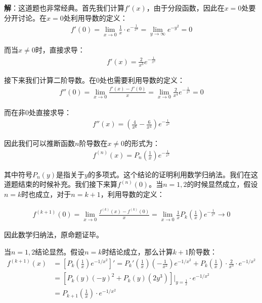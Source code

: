 \documentclass{ctexart}
\let\oldtextbf\textbf %
\renewcommand{\textbf}[1]{\textcolor{btex}{\oldtextbf{#1}}} %
\begin{document}
\textbf{解}：这道题也非常经典。首先我们计算$f'(x)$，由于分段函数，因此在$x=0$处要分开讨论。在$x=0$处利用导数的定义：
\begin{align*}
f'(0)=\lim_{x\to 0}\frac{1}{x}\cdot e^{-\frac{1}{x^2}}=\lim_{y\to \infty}e^{-y^2}=0  
\end{align*}

而当$x\neq 0$时，直接求导：
\begin{align*}
    f'(x)=\frac{2}{x^3}e^{-\frac{1}{x^2}}
\end{align*}

接下来我们计算二阶导数。在0处也需要利用导数的定义：
\begin{align*}
    f''(0)=\lim_{x\to 0}\frac{f'(x)-f'(0)}{x}=\lim_{x\to 0}\frac{2}{x^4}e^{-\frac{1}{x^2}}=0
\end{align*}

而在非0处直接求导：
\begin{align*}
    f''(x)=(\frac{4}{x^6}-\frac{6}{x^4})e^{-\frac{1}{x^2}}
\end{align*}

因此我们可以推断函数$n$阶导数在$x\neq 0$的形式为：
\begin{align*}
    f^{(n)}(x)=P_n(\frac{1}{x})e^{-\frac{1}{x^2}}
\end{align*}

其中符号$P_n(y)$是指关于$y$的多项式。这个结论的证明利用数学归纳法。我们在这道题结束的时候补充。我们接下来算$f^{(n)}(0)$。当$n=1,2$的时候显然成立，假设$n=k$时也成立，对于$n=k+1$，利用导数的定义：

\begin{align*}
f^{(k+1)}(0)=\lim_{x\to 0}\frac{f^{(k)}(x)-f^{(k)}(0)}{x}=\lim_{x\to 0}\frac{1}{x}P_k(\frac{1}{x})e^{-\frac{1}{x^2}}\to 0 
\end{align*}

因此数学归纳法，原命题证毕。
\begin{tcolorbox}[
    colback=bac2,     %
    colframe=fra2,   %
    coltitle=white,             %
    coltext=tex2,
    title=补充证明：数学归纳法证明高阶导数的形式,
    fonttitle=\bfseries,        %
arc=3mm,                     %
breakable
]
当$n=1,2$结论显然。假设$n=k$时结论成立，那么计算$k+1$阶导数：
\begin{align*}
f^{(k+1)}(x)&=\left[P_k(\frac{1}{x})e^{-1/x^2} \right]'=P_k'(\frac{1}{x})(-\frac{1}{x^2})e^{-1/x^2}
+P_k(\frac{1}{x})\cdot \frac{2}{x^3}\cdot e^{-1/x^2}\\
&=[P_k(y)(-y)^2+P_k(y)(2y^3)]|_{y=\frac{1}{x} }\cdot e^{-1/x^2}\\
&=P_{k+1}(\frac{1}{x}) \cdot e^{-1/x^2}
\end{align*}
\end{tcolorbox}
\end{document}
